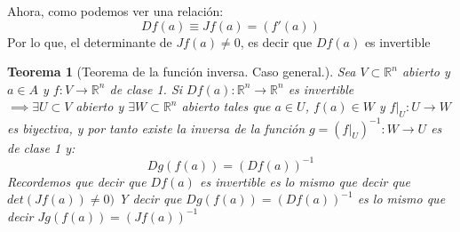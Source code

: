 \documentclass[11pt, a4paper, titlepage]{article}
\newcommand{\R}{\mathbb{R}}
\theoremstyle{theorem-style}
\newtheorem*{nth}{Teorema}
\theoremstyle{definition-style}
\theoremstyle{remark-style}
\theoremstyle{example-style}
\begin{document}
Ahora, como podemos ver una relación: 
\[
Df(a) \equiv Jf(a) = ( f'(a))
\]
Por lo que, el determinante de $Jf(a) \ne 0$, es decir que $Df(a)$ es invertible
\begin{nth}[Teorema de la función inversa. Caso general.]
	Sea $V \subset \R^n$ abierto y $a\in A$ y $f:V \to \R^n$ de clase 1. Si  
$Df(a): \R^n \to \R^n$ es invertible \\
$\implies \exists U\subset V$ abierto y $\exists W\subset\R^n$ abierto tales que $a\in U $, $f(a) \in W$ y $f|_U : U \to W$ es biyectiva, y por tanto existe la inversa de la función $g = (f|_U)^{-1}: W \to U$ es de clase 1 y:
	\[
	Dg(f(a)) = (Df(a))^{-1}
	\]
Recordemos que decir que $Df(a)$ es invertible es lo mismo que decir que $det(Jf(a)) \ne 0)$
Y decir que $Dg(f(a)) = (Df(a))^{-1}$ es lo mismo que decir $Jg(f(a)) = (Jf(a))^{-1}$
\end{nth}
\end{document}
